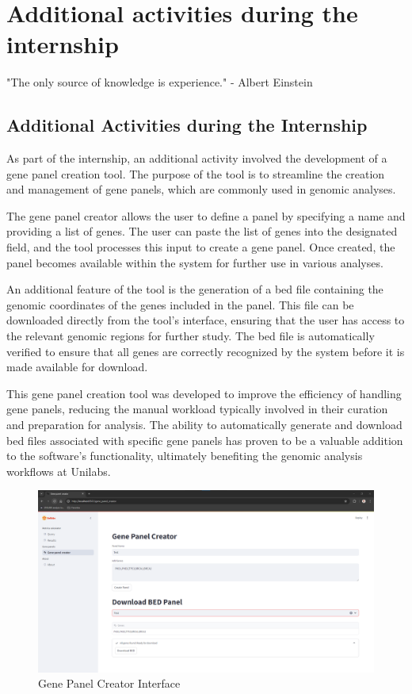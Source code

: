 \chapter{Additional activities during the internship}
\label{chapter:Additional activities during the internship}

\begin{introduction}
    "The only source of knowledge is experience." - Albert Einstein
\end{introduction}


\section{Additional Activities during the Internship}

As part of the internship, an additional activity involved the development of a gene panel creation tool. The purpose of the tool is to streamline the creation and management of gene panels, which are commonly used in genomic analyses.

The gene panel creator allows the user to define a panel by specifying a name and providing a list of genes. The user can paste the list of genes into the designated field, and the tool processes this input to create a gene panel. Once created, the panel becomes available within the system for further use in various analyses.

An additional feature of the tool is the generation of a \ac{bed} file containing the genomic coordinates of the genes included in the panel. This file can be downloaded directly from the tool's interface, ensuring that the user has access to the relevant genomic regions for further study. The \ac{bed} file is automatically verified to ensure that all genes are correctly recognized by the system before it is made available for download.

This gene panel creation tool was developed to improve the efficiency of handling gene panels, reducing the manual workload typically involved in their curation and preparation for analysis. The ability to automatically generate and download \ac{bed} files associated with specific gene panels has proven to be a valuable addition to the software's functionality, ultimately benefiting the genomic analysis workflows at Unilabs.

\begin{figure}[H]
    \centering
    \includegraphics[width=\textwidth]{figs/v3.13.png}
    \caption{Gene Panel Creator Interface}
    \label{fig:gene_panel_creator}
\end{figure}
